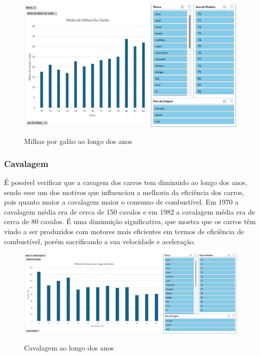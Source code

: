 \documentclass[a4paper]{article}
\begin{document}
\begin{figure}[h!]
    \centering
    \includegraphics[width=1\textwidth]{Recursos/MilhasPorGalaoGrafico.png} %
    \vspace{0.5cm}
    \label{fig:mpg}
    \caption{Milhas por galão ao longo dos anos}
\end{figure}
\newpage



\subsubsection{Cavalagem}
É possível verificar que a cavagem dos carros tem diminuido ao longo dos anos, sendo esse um dos motivos
que influenciou a melhoria da eficiência dos carros, pois quanto maior a cavalagem maior o consumo de combustível.
Em 1970 a cavalagem média era de cerca de 150 cavalos e em 1982 a cavalagem média era de cerca de 80 cavalos.
É uma diminuição significativa, que mostra que os carros têm vindo a ser produzidos com motores mais eficientes em termos
de eficiência de combustível, porém sacrificando a sua velocidade e aceleração.

\begin{figure}[h!]
    \centering
    \includegraphics[width=1\textwidth]{Recursos/CavalagemGrafico.png} %
    \vspace{0.5cm}
    \label{fig:cavg}
    \caption{Cavalagem ao longo dos anos}
\end{figure}
\end{document}
